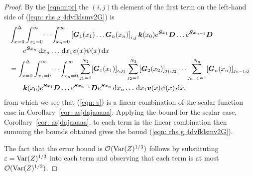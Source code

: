 \begin{proof}
	By the \ref{eqn:mpr} the \((i,j)\)th element of the first term on the left-hand side of (\ref{eqn: rhs g 4dvfklsmv2G}) is 
	\begin{align}
		&\int_{x=0}^\Delta \int_{x_1=0}^\infty \dots \int_{x_n=0}^\infty \left[\boldsymbol G_1(x_1)\dots \boldsymbol G_n(x_n)\right]_{i,j} \boldsymbol k(x_0) e^{\boldsymbol{S}x_1} \boldsymbol D \dots 
		e^{\boldsymbol{S}x_{n-1}} \boldsymbol D \nonumber
		\\&\qquad{} e^{\boldsymbol{S}x_n} \, \mathrm{d} x_n \dots \, \mathrm{d} x_1 {\boldsymbol v}(x) \psi(x) \, \mathrm{d} x \nonumber 
		\\&= \int_{x=0}^\Delta \int_{x_1=0}^\infty \dots \int_{x_n=0}^\infty \sum_{j_1=1}^{N_2}[\boldsymbol G_1(x_1)]_{i,j_1}\sum_{j_2=1}^{N_3}[\boldsymbol G_2(x_2)]_{j_1,j_2}\dots \sum_{j_{n-1}=1}^{N_n} [\boldsymbol G_n(x_n)]_{j_{n-1},j} \nonumber
		\\&\qquad{} \boldsymbol k(x_0) e^{\boldsymbol{S}x_1} \boldsymbol D  \dots
		e^{\boldsymbol{S}x_{n-1}} \boldsymbol D 
		e^{\boldsymbol{S}x_n} \, \mathrm{d} x_n \dots \, \mathrm{d} x_1 {\boldsymbol v}(x) \psi(x) \, \mathrm{d} x, \label{eqn: s}
	\end{align}
	from which we see that (\ref{eqn: s}) is a linear combination of the scalar function case in Corollary~\ref{cor: asjdajaaaaa}. Applying the bound for the scalar case, Corollary~\ref{cor: asjdajaaaaa}, to each term in the linear combination then summing the bounds obtained gives the bound (\ref{eqn: rhs g 4dvfklsmv2G}). 

	The fact that the error bound is \(\mathcal O(\mathrm{Var}(Z)^{1/3})\) follows by substituting \(\varepsilon=\mathrm{Var}(Z)^{1/3}\) into each term and observing that each term is at most \(\mathcal O(\mathrm{Var}(Z)^{1/3})\). 
\end{proof}


